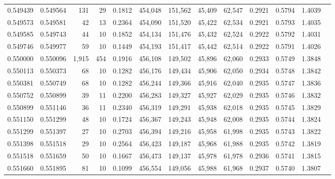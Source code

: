 \begin{tabular}{rrrrrrrrrrrrr}
0.549439 & 0.549564 &   131 &  29 &                                     0.1812 & 454,048 & 151,562 &  45,409 &  62,547 & 0.2921 & 0.5794 & 1.4039 \\
0.549573 & 0.549581 &    42 &  13 &                                     0.2364 & 454,090 & 151,520 &  45,422 &  62,534 & 0.2921 & 0.5793 & 1.4035 \\
0.549585 & 0.549743 &    44 &  10 &                                     0.1852 & 454,134 & 151,476 &  45,432 &  62,524 & 0.2922 & 0.5792 & 1.4031 \\
0.549746 & 0.549977 &    59 &  10 &                                     0.1449 & 454,193 & 151,417 &  45,442 &  62,514 & 0.2922 & 0.5791 & 1.4026 \\
0.550000 & 0.550096 & 1,915 & 454 &                                     0.1916 & 456,108 & 149,502 &  45,896 &  62,060 & 0.2933 & 0.5749 & 1.3848 \\
0.550113 & 0.550373 &    68 &  10 &                                     0.1282 & 456,176 & 149,434 &  45,906 &  62,050 & 0.2934 & 0.5748 & 1.3842 \\
0.550381 & 0.550749 &    68 &  10 &                                     0.1282 & 456,244 & 149,366 &  45,916 &  62,040 & 0.2935 & 0.5747 & 1.3836 \\
0.550752 & 0.550899 &    39 &  11 &                                     0.2200 & 456,283 & 149,327 &  45,927 &  62,029 & 0.2935 & 0.5746 & 1.3832 \\
0.550899 & 0.551146 &    36 &  11 &                                     0.2340 & 456,319 & 149,291 &  45,938 &  62,018 & 0.2935 & 0.5745 & 1.3829 \\
0.551150 & 0.551299 &    48 &  10 &                                     0.1724 & 456,367 & 149,243 &  45,948 &  62,008 & 0.2935 & 0.5744 & 1.3824 \\
0.551299 & 0.551397 &    27 &  10 &                                     0.2703 & 456,394 & 149,216 &  45,958 &  61,998 & 0.2935 & 0.5743 & 1.3822 \\
0.551398 & 0.551518 &    29 &  10 &                                     0.2564 & 456,423 & 149,187 &  45,968 &  61,988 & 0.2935 & 0.5742 & 1.3819 \\
0.551518 & 0.551659 &    50 &  10 &                                     0.1667 & 456,473 & 149,137 &  45,978 &  61,978 & 0.2936 & 0.5741 & 1.3815 \\
0.551660 & 0.551895 &    81 &  10 &                                     0.1099 & 456,554 & 149,056 &  45,988 &  61,968 & 0.2937 & 0.5740 & 1.3807 \\

\end{tabular}
